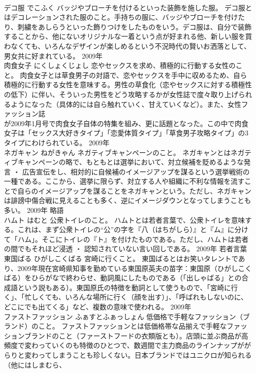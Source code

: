 \documentclass[8pt]{extreport}
\begin{document}
\begin{CJK}{UTF8}{min}
\\	デコ服	でこふく	バッジやブローチを付けるといった装飾を施した服。	デコ服とはデコレーションされた服のこと。手持ちの服に、バッジやブローチを付けたり、刺繍をあしらうといった飾りつけをしたものをいう。デコ服は、自分で装飾することから、他にないオリジナルな一着という点が好まれる他、新しい服を買わなくても、いろんなデザインが楽しめるという不況時代の賢いお洒落として、男女共に好まれている。	2009年	
\\	肉食女子	にくしょくじょし	恋やセックスを求め、積極的に行動する女性のこと。	肉食女子とは草食男子の対語で、恋やセックスを手中に収めるため、自ら積極的に行動する女性を意味する。男性の草食化（恋やセックスに対する積極性の低下）に伴い、そういった男性をどう攻略するかが女性誌で度々取り上げられるようになった（具体的には自ら触れていく、甘えていくなど）。また、女性ファッション誌
\\	が2009年1月号で肉食女子自体の特集を組み、更に話題となった。この中で肉食女子は「セックス大好きタイプ」「恋愛体質タイプ」「草食男子攻略タイプ」の3タイプにわけられている。	2009年	
\\	ネガキャン	ねがきゃん	ネガティブキャンペーンのこと。	ネガキャンとはネガティブキャンペーンの略で、もともとは選挙において、対立候補を貶めるような発言 ・ 広告宣伝をし、相対的に自候補のイメージアップを謀るという選挙戦術の一種である。ここから、選挙に限らず、対立する人や組織に不利な情報を流すことで自らのイメージアップを謀ることをネガキャンという。ただし、ネガキャンは誹謗中傷合戦に見えることも多く、逆にイメージダウンとなってしまうことも多い。	2009年	略語	
\\	ハムト	はむと	公衆トイレのこと。	ハムトとは若者言葉で、公衆トイレを意味する。これは、まず公衆トイレの“公”の字を『八（はちがしら）』と『ム』に分けて「ハム」。そこにトイレの『ト』を付けたものである。ただし、ハムトは若者の間でもそれほど浸透 ・ 認知されていない言い回しである。	2009年	若者言葉	
\\	東国ばる	ひがしこくばる	宮崎に行くこと。	東国ばるとはお笑いタレントであり、2009年現在宮崎県知事を勤めている東国原英夫の苗字：東国原（ひがしこくばる）をひらがなで終わらせ、動詞風にしたものである（「出しゃばる」との合成語という説もある）。東国原氏の特徴を動詞として使うもので、「宮崎に行く」、「忙しくても、いろんな場所に行く（顔を出す）」、「呼ばれもしないのに、どこにでも出てくる」など、複数の意味で使われる。	2009年	
\\	ファストファッション	ふぁすとふぁっしょん	低価格で手軽なファッション（ブランド）のこと。	ファストファッションとは低価格帯な品揃えで手軽なファッションブランドのこと（ファーストフードの衣類版とも）。店頭に並ぶ商品が高頻度で変わっていくのも特徴のひとつで、数週間で主力商品のラインナップががらりと変わってしまうことも珍しくない。日本ブランドではユニクロが知られる（他にはしまむら、

\end{CJK}
\end{document}
